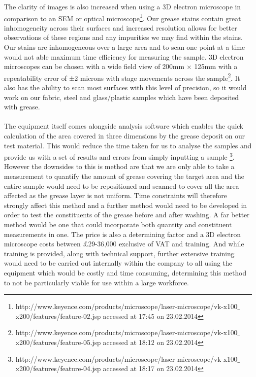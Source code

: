 \documentclass[a4paper ,12pt]{article}
\begin{document}
The clarity of images is also increased when using a 3D electron microscope in comparison to an SEM or optical microscope\footnote{http://www.keyence.com/products/microscope/laser-microscope/vk-x100$\_$x200/features/feature-02.jsp accessed at 17:45 on 23.02.2014}. Our grease stains contain great inhomogeneity across their surfaces and increased resolution allows for better observations of these regions and any impurities we may find within the stains. Our stains are inhomogeneous over a large area and to scan one point at a time would not able maximum time efficiency for measuring the sample. 3D electron microscopes can be chosen with a wide field view of 200mm $\times$ 125mm with a repeatability error of $\pm$2 microns with stage movements across the sample\footnote{http://www.keyence.com/products/microscope/laser-microscope/vk-x100$\_$x200/features/feature-05.jsp accessed at 18:12 on 23.02.2014}. It also has the ability to scan most surfaces with this level of precision, so it would work on our fabric, steel and glass/plastic samples which have been deposited with grease.\\\\The equipment itself comes alongside analysis software which enables the quick calculation of the area covered in three dimensions by the grease deposit on our test material. This would reduce the time taken for us to analyse the samples and provide us with a set of results and errors from simply inputting a sample \footnote{http://www.keyence.com/products/microscope/laser-microscope/vk-x100$\_$x200/features/feature-04.jsp accessed at 18:17 on 23.02.2014}. However the downsides to this is method are that we are only able to take a measurement to quantify the amount of grease covering the target area and the entire sample would need to be repositioned and scanned to cover all the area affected as the grease layer is not uniform. Time constraints will therefore strongly affect this method and a further method would need to be developed in order to test the constituents of the grease before and after washing. A far better method would be one that could incorporate both quantity and constituent measurements in one. The price is also a determining factor and a 3D electron microscope costs between \pounds29-36,000 exclusive of VAT and training. And while training is provided, along with technical support, further extensive training would need to be carried out internally within the company to all using the equipment which would be costly and time consuming, determining this method to not be particularly viable for use within a large workforce.
\end{document}
